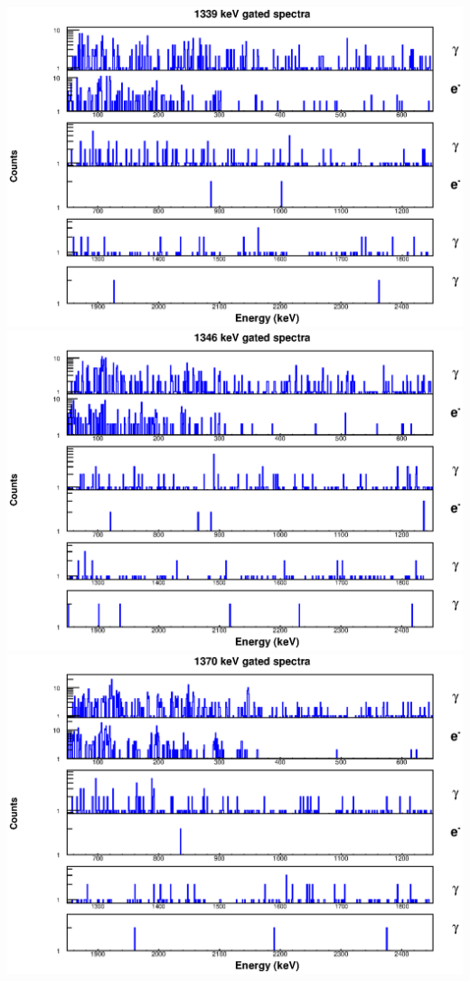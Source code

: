 \includegraphics[scale=0.8]{154Gd_Appendix/1339_combined.eps}
\includegraphics[scale=0.8]{154Gd_Appendix/1346_combined.eps}
\includegraphics[scale=0.8]{154Gd_Appendix/1370_combined.eps}
